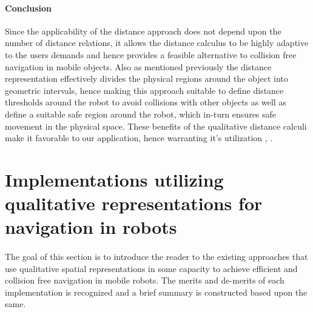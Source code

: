 	\paragraph{Conclusion}Since the applicability of the distance approach does not depend upon the number of distance relations, it allows the distance calculus to be highly adaptive to the users demands and hence provides a feasible alternative to collision free navigation in mobile objects. Also as mentioned previously the distance representation effectively divides the physical regions around the object into geometric intervals, hence making this approach suitable to define distance thresholds around the robot to avoid collisions with other objects as well as define a suitable safe region around the robot, which in-turn ensures safe movement in the physical space. These benefits of the qualitative distance calculi make it favorable to our application, hence warranting it's utilization \cite{clementini1997qualitative}, \cite{lowe1975geography}.

	\section{Implementations utilizing qualitative representations for navigation in robots}
	\paragraph{} The goal of this section is to introduce the reader to the existing approaches that use qualitative spatial representations in some capacity to achieve efficient and collision free navigation in mobile robots. The merits and de-merits of each implementation is recognized and a brief summary is constructed based upon the same.
	
